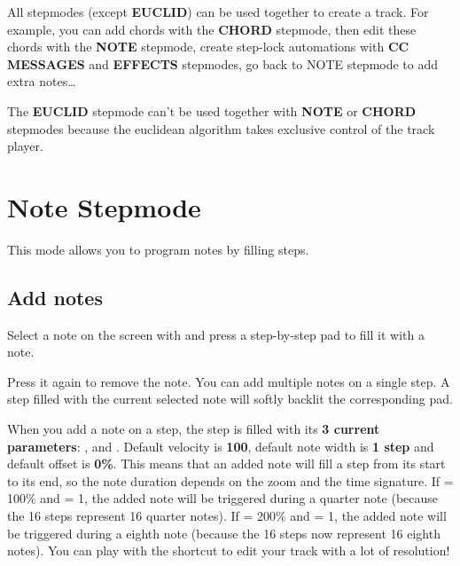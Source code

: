 All stepmodes (except \textbf{EUCLID}) can be used together to create a track. For example, you can add chords with the \textbf{CHORD} stepmode, then edit these chords with the \textbf{NOTE} stepmode, create step-lock automations with \textbf{CC MESSAGES} and \textbf{EFFECTS} stepmodes, go back to NOTE stepmode to add extra notes\ldots

The \textbf{EUCLID} stepmode can't be used together with \textbf{NOTE} or \textbf{CHORD} stepmodes because the euclidean algorithm takes exclusive control of the track player.


\section{Note Stepmode}

This mode allows you to program notes by filling steps.

\subsection{Add notes}
Select a note on the screen with \encodericon{} and press a step-by-step pad \stepbystepicon{} to fill it with a note.


Press it again to remove the note. You can add multiple notes on a single step. A step filled with the current selected note will softly backlit the corresponding pad.



When you add a note on a step, the step is filled with its \textbf{3 current parameters}: ,  and . Default velocity is \textbf{100}, default note width is \textbf{1 step} and default offset is \textbf{0\%}. This means that an added note will fill a step from its start to its end, so the note duration depends on the zoom and the time signature. If  = 100\% and  = 1, the added note will be triggered during a quarter note (because the 16 steps represent 16 quarter notes). If  = 200\% and  = 1, the added note will be triggered during a eighth note (because the 16 steps now represent 16 eighth notes). You can play with the  shortcut to edit your track with a lot of resolution!

